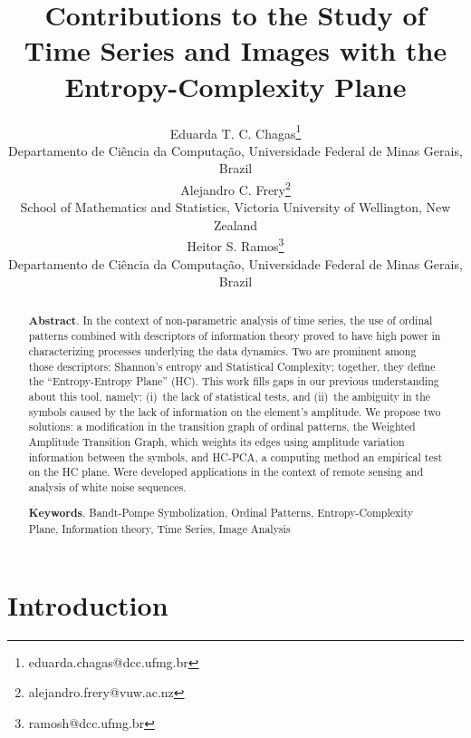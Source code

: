 \documentclass[a4,11pt]{pssbmac}
\begin{document}
	
	\title{Contributions to the Study of Time Series and Images with the Entropy-Complexity Plane}
	
	\author{
		{\large Eduarda T. C. Chagas}\thanks{eduarda.chagas@dcc.ufmg.br}\\
		{\small Departamento de Ci\^encia da Computa\c c\~ao, Universidade Federal de Minas Gerais, Brazil} \\
		{\large Alejandro C. Frery}\thanks{alejandro.frery@vuw.ac.nz} \\
		{\small School of Mathematics and Statistics, Victoria University of Wellington, New Zealand} \\
		{\large Heitor S. Ramos}\thanks{ramosh@dcc.ufmg.br} \\
		{\small Departamento de Ci\^encia da Computa\c c\~ao, Universidade Federal de Minas Gerais, Brazil} \\
	}
	
	\criartitulo
	
	\begin{abstract}
		{\bf Abstract}. In the context of non-parametric analysis of time series, the use of ordinal patterns combined with descriptors of information theory proved to have high power in characterizing processes underlying the data dynamics.
		Two are prominent among those descriptors: Shannon's entropy and Statistical Complexity; together, they define the ``Entropy-Entropy Plane'' (HC). 
		This work fills gaps in our previous understanding about this tool, namely:
		(i)~the lack of statistical tests, and 
		(ii)~the ambiguity in the symbols caused by the lack of information on the element's amplitude.
		We propose two solutions: a modification in the transition graph of ordinal patterns, the Weighted Amplitude Transition Graph, which weights its edges using amplitude variation information between the symbols, and HC-PCA, a computing method an empirical test on the HC plane.
		Were developed applications in the context of remote sensing and analysis of white noise sequences. 
		
		\noindent
		{\bf Keywords}. Bandt-Pompe Symbolization, Ordinal Patterns, Entropy-Complexity Plane, Information theory, Time Series, Image Analysis
	\end{abstract}
	
	\section{Introduction}
	
\end{document}
